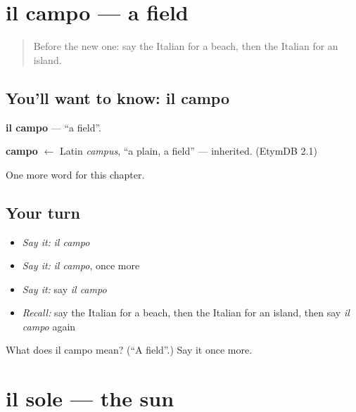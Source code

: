 \section[il campo]{il campo — a field}

\label{lesson:IT-C66-campo}



\begin{quote}
Before the new one: say the Italian for a beach, then the Italian for an island.
\end{quote}

\subsection*{You'll want to know: il campo}
\textbf{il campo} — \textquotedblleft{}a field\textquotedblright{}.

\begin{cousinweb}
\textbf{campo} $\leftarrow$ Latin \emph{campus}, \textquotedblleft{}a plain, a field\textquotedblright{} — inherited. (EtymDB 2.1)
\end{cousinweb}

\begin{grammarlens}[title={What you've built}]
One more word for this chapter.
\end{grammarlens}

\subsection*{Your turn}
\begin{itemize}
\raggedright
  \item \emph{Say it:} \emph{il campo}
  \item \emph{Say it:} \emph{il campo}, once more
  \item \emph{Say it:} say \emph{il campo}
  \item \emph{Recall:} say the Italian for a beach, then the Italian for an island, then say \emph{il campo} again
\end{itemize}

\begin{tcolorbox}[breakable,colback=teal!4,colframe=teal!35!black,title={Before you move on}]
What does il campo mean? (\textquotedblleft{}A field\textquotedblright{}.) Say it once more.
\end{tcolorbox}
\section[il sole]{il sole — the sun}

